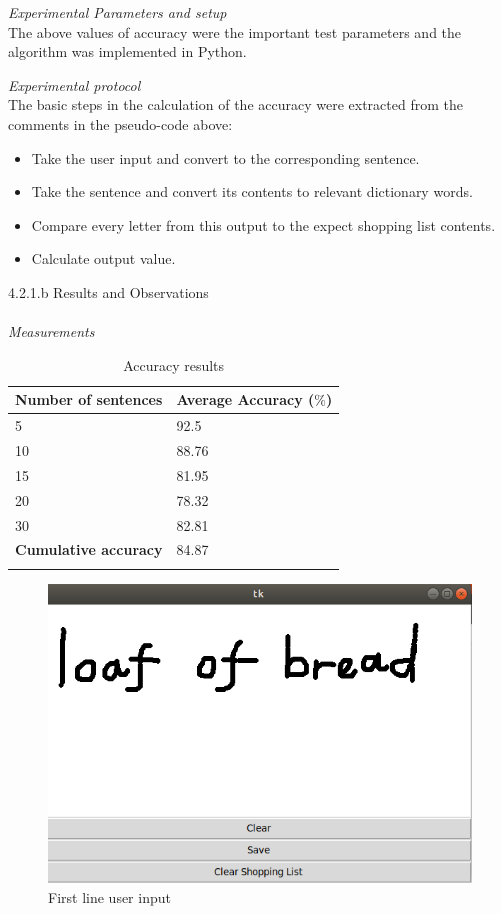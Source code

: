 \textit{Experimental Parameters and setup}\\
The above values of accuracy were the important test parameters and the algorithm was implemented in Python.

\textit{Experimental protocol}\\
The basic steps in the calculation of the accuracy were extracted from the comments in the pseudo-code above:
\begin{itemize}
	\item Take the user input and convert to the corresponding sentence.
	\item Take the sentence and convert its contents to relevant dictionary words.
	\item Compare every letter from this output to the expect shopping list contents.
	\item Calculate output value.
\end{itemize}

4.2.1.b Results and Observations\\\\
\textit{Measurements}
\begin{center}
	\begin{longtable}{|p{5cm}|p{5cm}|}
		\hline
		\textbf{Number of sentences} &
		\textbf{Average Accuracy ($\%$)} \\
		\hline
		5
		&
		92.5
		\\
		\hline
		10
		&
		88.76
		\\
		\hline
		15
		&
		81.95
		\\
		\hline
		20
		&
		78.32
		\\
		\hline
		30
		&
		82.81
		\\
		\hline
		\textbf{Cumulative accuracy}
		&
		84.87
		\\
		\hline		
		\caption{Accuracy results}
	\end{longtable}
\end{center}

\begin{figure}[h]
	\centering
	\includegraphics[scale=0.4]{101}
	\caption{First line user input}
\end{figure}

